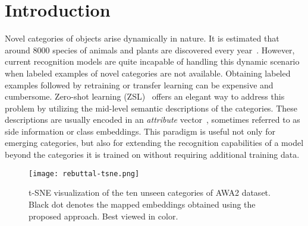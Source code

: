 \documentclass[10pt,twocolumn,letterpaper]{article}
\begin{document}
\section{Introduction}

Novel categories of objects arise dynamically in nature. It is estimated that around 8000 species of animals and plants are discovered every year~\cite{numObj}.  
However, current recognition models are quite incapable of handling this dynamic scenario when labeled examples of novel categories  are not available. 
Obtaining labeled examples followed by retraining or transfer learning can be expensive and cumbersome. 
Zero-shot learning  (ZSL)~\cite{palatucci2009zero,akata2013label,norouzi2013zero,socher2013zero,zhang2016zero,lampert2014attribute} offers an elegant way to address this problem by utilizing the mid-level semantic descriptions of the categories.  These descriptions are usually encoded in an \textit{attribute} vector~\cite{ferrari2008learning,farhadi2009describing,farhadi2010attribute}, sometimes referred to as side information or class embeddings. 
This paradigm is useful not only for emerging categories, but also for extending the recognition capabilities of a model beyond the categories it is trained on without requiring additional training data.
\begin{figure}[t]
	\centering
	\texttt{[image: rebuttal-tsne.png]}
	\caption{\small t-SNE visualization \cite{maaten2008visualizing} of the ten unseen categories of AWA2 \cite{xian2017zero1} dataset. Black dot denotes the mapped embeddings obtained using the proposed approach. Best viewed in color.}
	\label{tsne-awa} 
\end{figure} 
\end{document}
